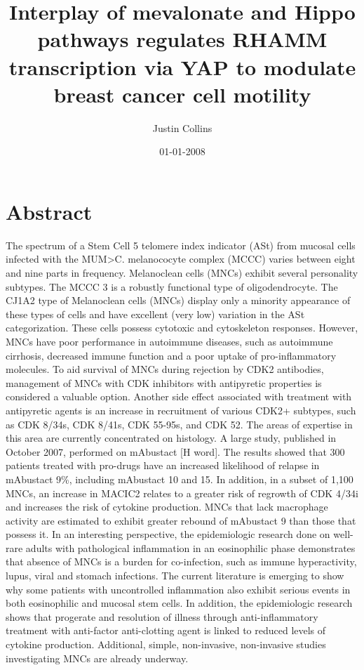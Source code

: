 \documentclass{article}%
\title{Interplay of mevalonate and Hippo pathways regulates RHAMM transcription via YAP to modulate breast cancer cell motility}%
\author{Justin Collins}%
\affil{CNRS UMR 5203, INSERM U661, and Montpellier 1 \& 2 University, Institute of Functional Genomics, Montpellier, France, \newline%
    Laboratory for Diabetes Cell Therapy, Institute for Research in Biotherapy, University Hospital St{-}Eloi, Montpellier, France}%
\date{01{-}01{-}2008}%
\begin{document}
%
\normalsize%
\maketitle%
\section{Abstract}%
\label{sec:Abstract}%
The spectrum of a Stem Cell 5 telomere index indicator (ASt) from mucosal cells infected with the MUM>C. melanococyte complex (MCCC) varies between eight and nine parts in frequency. Melanoclean cells (MNCs) exhibit several personality subtypes. The MCCC 3 is a robustly functional type of oligodendrocyte.\newline%
The CJ1A2 type of Melanoclean cells (MNCs) display only a minority appearance of these types of cells and have excellent (very low) variation in the ASt categorization. These cells possess cytotoxic and cytoskeleton responses. However, MNCs have poor performance in autoimmune diseases, such as autoimmune cirrhosis, decreased immune function and a poor uptake of pro{-}inflammatory molecules. To aid survival of MNCs during rejection by CDK2 antibodies, management of MNCs with CDK inhibitors with antipyretic properties is considered a valuable option.\newline%
Another side effect associated with treatment with antipyretic agents is an increase in recruitment of various CDK2+ subtypes, such as CDK 8/34s, CDK 8/41s, CDK 55{-}95s, and CDK 52.\newline%
The areas of expertise in this area are currently concentrated on histology. A large study, published in October 2007, performed on mAbustact {[}H word{]}. The results showed that 300 patients treated with pro{-}drugs have an increased likelihood of relapse in mAbustact 9\%, including mAbustact 10 and 15.\newline%
In addition, in a subset of 1,100 MNCs, an increase in MACIC2 relates to a greater risk of regrowth of CDK 4/34i and increases the risk of cytokine production. MNCs that lack macrophage activity are estimated to exhibit greater rebound of mAbustact 9 than those that possess it.\newline%
In an interesting perspective, the epidemiologic research done on well{-}rare adults with pathological inflammation in an eosinophilic phase demonstrates that absence of MNCs is a burden for co{-}infection, such as immune hyperactivity, lupus, viral and stomach infections. The current literature is emerging to show why some patients with uncontrolled inflammation also exhibit serious events in both eosinophilic and mucosal stem cells.\newline%
In addition, the epidemiologic research shows that progerate and resolution of illness through anti{-}inflammatory treatment with anti{-}factor anti{-}clotting agent is linked to reduced levels of cytokine production.\newline%
Additional, simple, non{-}invasive, non{-}invasive studies investigating MNCs are already underway.
\end{document}
